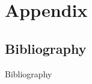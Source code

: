 \section{Appendix}
\label{sec:appendix}

\label{sec:bibliography}
\subsection{Bibliography}
\begin{frame}[allowframebreaks]{Bibliography}
    \printbibliography
\end{frame}

